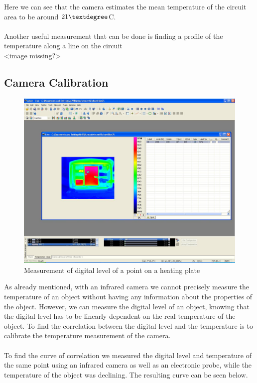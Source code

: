 \documentclass[english]{article}
\begin{document}
Here we can see that the camera estimates the mean temperature of the circuit area to be around $21 \textdegree$C.\\
\\
Another useful measurement that can be done is finding a profile of the temperature along a line on the circuit\\
<image missing?>

\subsection{Camera Calibration}
\begin{figure}[H]
	\centering
	\includegraphics[width=1\linewidth]{Pictures/calib.JPG}
	\caption{Measurement of digital level of a point on a heating plate}
	\label{fig:four}
\end{figure}
As already mentioned, with an infrared camera we cannot precisely measure the temperature of an object without having any information about the properties of the object.
However, we can measure the digital level of an object, knowing that the digital level has to be linearly dependent on the real temperature of the object.
To find the correlation between the digital level and the temperature is to calibrate the temperature measurement of the camera.\\
\\
To find the curve of correlation we measured the digital level and temperature of the same point using an infrared camera as well as an electronic probe, while the temperature of the object was declining.
The resulting curve can be seen below.
\end{document}
